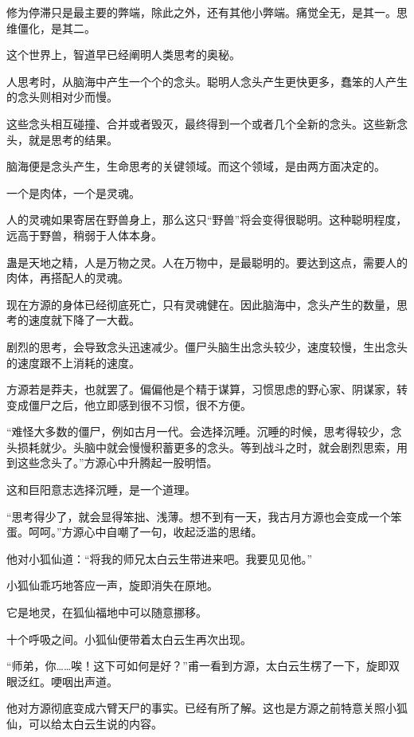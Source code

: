 
\begin{this_body}

修为停滞只是最主要的弊端，除此之外，还有其他小弊端。痛觉全无，是其一。思维僵化，是其二。

这个世界上，智道早已经阐明人类思考的奥秘。

人思考时，从脑海中产生一个个的念头。聪明人念头产生更快更多，蠢笨的人产生的念头则相对少而慢。

这些念头相互碰撞、合并或者毁灭，最终得到一个或者几个全新的念头。这些新念头，就是思考的结果。

脑海便是念头产生，生命思考的关键领域。而这个领域，是由两方面决定的。

一个是肉体，一个是灵魂。

人的灵魂如果寄居在野兽身上，那么这只“野兽”将会变得很聪明。这种聪明程度，远高于野兽，稍弱于人体本身。

蛊是天地之精，人是万物之灵。人在万物中，是最聪明的。要达到这点，需要人的肉体，再搭配人的灵魂。

现在方源的身体已经彻底死亡，只有灵魂健在。因此脑海中，念头产生的数量，思考的速度就下降了一大截。

剧烈的思考，会导致念头迅速减少。僵尸头脑生出念头较少，速度较慢，生出念头的速度跟不上消耗的速度。

方源若是莽夫，也就罢了。偏偏他是个精于谋算，习惯思虑的野心家、阴谋家，转变成僵尸之后，他立即感到很不习惯，很不方便。

“难怪大多数的僵尸，例如古月一代。会选择沉睡。沉睡的时候，思考得较少，念头损耗就少。头脑中就会慢慢积蓄更多的念头。等到战斗之时，就会剧烈思索，用到这些念头了。”方源心中升腾起一股明悟。

这和巨阳意志选择沉睡，是一个道理。

“思考得少了，就会显得笨拙、浅薄。想不到有一天，我古月方源也会变成一个笨蛋。呵呵。”方源心中自嘲了一句，收起泛滥的思绪。

他对小狐仙道：“将我的师兄太白云生带进来吧。我要见见他。”

小狐仙乖巧地答应一声，旋即消失在原地。

它是地灵，在狐仙福地中可以随意挪移。

十个呼吸之间。小狐仙便带着太白云生再次出现。

“师弟，你……唉！这下可如何是好？”甫一看到方源，太白云生楞了一下，旋即双眼泛红。哽咽出声道。

他对方源彻底变成六臂天尸的事实。已经有所了解。这也是方源之前特意关照小狐仙，可以给太白云生说的内容。


\end{this_body}
